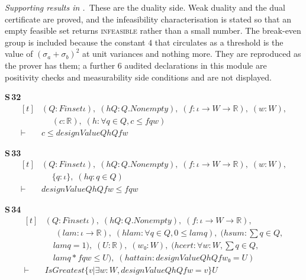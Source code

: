\noindent\emph{Supporting results in .}~These are the duality side. Weak duality and the dual certificate are proved, and the infeasibility characterisation is stated so that an empty feasible set returns \textsc{infeasible} rather than a small number. The break-even group is included because the constant $4$ that circulates as a threshold is the value of $(\sigma_{a}+\sigma_{b})^{2}$ at unit variances and nothing more. They are reproduced as the prover has them; a further $6$ audited declarations in this module are positivity checks and measurability side conditions and are not displayed.

\noindent\textbf{S\,32}\quad{}
{\footnotesize\[ \begin{aligned}[t]
&(\mathit{Q} : \mathit{Finset} \iota ),\; (\mathit{hQ} : \mathit{Q}.\mathit{Nonempty}),\; (\mathit{f} : \iota \to \mathit{W} \to \mathbb{R} ),\; (\mathit{w} : \mathit{W}),\\
&\quad \; (\mathit{c} : \mathbb{R} ),\; (\mathit{h} : \forall \mathit{q} \in \mathit{Q}, \mathit{c} \leq \mathit{f} \mathit{q} \mathit{w})\\
\vdash\;&\mathit{c} \leq \mathit{designValue} \mathit{Q} \mathit{hQ} \mathit{f} \mathit{w}
\end{aligned} \]}

\noindent\textbf{S\,33}\quad{}
{\footnotesize\[ \begin{aligned}[t]
&(\mathit{Q} : \mathit{Finset} \iota ),\; (\mathit{hQ} : \mathit{Q}.\mathit{Nonempty}),\; (\mathit{f} : \iota \to \mathit{W} \to \mathbb{R} ),\; (\mathit{w} : \mathit{W}),\\
&\quad \; \{ \mathit{q} : \iota \},\; (\mathit{hq} : \mathit{q} \in \mathit{Q})\\
\vdash\;&\mathit{designValue} \mathit{Q} \mathit{hQ} \mathit{f} \mathit{w} \leq \mathit{f} \mathit{q} \mathit{w}
\end{aligned} \]}

\noindent\textbf{S\,34}\quad{}
{\footnotesize\[ \begin{aligned}[t]
&(\mathit{Q} : \mathit{Finset} \iota ),\; (\mathit{hQ} : \mathit{Q}.\mathit{Nonempty}),\; (\mathit{f} : \iota \to \mathit{W} \to \mathbb{R} ),\\
&\quad \; (\mathit{lam} : \iota \to \mathbb{R} ),\; (\mathit{hlam} : \forall \mathit{q} \in \mathit{Q}, 0 \leq \mathit{lam} \mathit{q}),\; (\mathit{hsum} : \textstyle\sum \mathit{q} \in \mathit{Q},\\
&\quad \mathit{lam} \mathit{q} = 1),\; (\mathit{U} : \mathbb{R} ),\; (\mathit{w₀} : \mathit{W}),\; (\mathit{hcert} : \forall \mathit{w} : \mathit{W}, \textstyle\sum \mathit{q} \in \mathit{Q},\\
&\quad \mathit{lam} \mathit{q} * \mathit{f} \mathit{q} \mathit{w} \leq \mathit{U}),\; (\mathit{hattain} : \mathit{designValue} \mathit{Q} \mathit{hQ} \mathit{f} \mathit{w₀} = \mathit{U})\\
\vdash\;&\mathit{IsGreatest} \{ \mathit{v} | \exists \mathit{w} : \mathit{W}, \mathit{designValue} \mathit{Q} \mathit{hQ} \mathit{f} \mathit{w} = \mathit{v}\} \mathit{U}
\end{aligned} \]}

